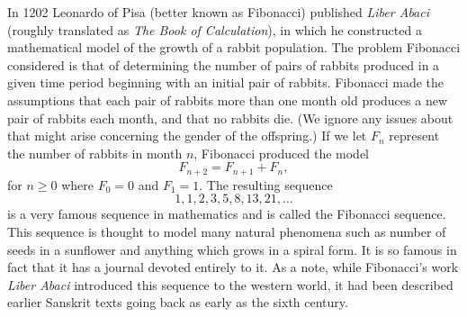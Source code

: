  \label{chap:diagonalization}

\vspace*{-17 pt}

\label{sec:appl_fib_num}

In 1202 Leonardo of Pisa (better known as Fibonacci) published \emph{Liber Abaci} (roughly translated as \emph{The Book of Calculation}), in which he constructed a mathematical model of the growth of a rabbit population. The problem Fibonacci considered is that of determining the number of pairs of rabbits produced in a given time period beginning with an initial pair of rabbits. Fibonacci made the assumptions that each pair of rabbits more than one month old produces a new pair of rabbits each month, and that no rabbits die. (We ignore any issues about that might arise concerning the gender of the offspring.) If we let $F_n$ represent the number of rabbits in month $n$, Fibonacci produced the model
\begin{equation}
F_{n+2} = F_{n+1} + F_{n}, \label{eq:Fibonacci}
\end{equation}
for $n \geq 0$ where $F_0 = 0$ and $F_1 = 1$. The resulting sequence 
\[1,1,2,3,5,8,13,21, \ldots\]
is a very famous sequence in mathematics and is called the Fibonacci sequence. This sequence is thought to model many natural phenomena such as number of seeds in a sunflower and anything which grows in a spiral form. It is so famous in fact that it has a journal devoted entirely to it. As a note, while Fibonacci's work \emph{Liber Abaci} introduced this sequence to the western world, it had been described earlier Sanskrit texts going back as early as the sixth century. 


